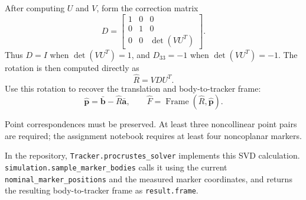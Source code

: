 \documentclass[11pt]{article}
\newcommand{\vct}[1]{\bm{#1}}
\newcommand{\Frame}{\operatorname{Frame}}
\begin{document}
After computing $U$ and $V$, form the correction matrix
\begin{equation}
D=
\begin{bmatrix}
1&0&0\\
0&1&0\\
0&0&\det(VU^T)
\end{bmatrix}.
\end{equation}
Thus $D=I$ when $\det(VU^T)=1$, and $D_{33}=-1$ when $\det(VU^T)=-1$. The rotation is then computed directly as
\begin{equation}
\boxed{\widehat R=VDU^T.}
\end{equation}
Use this rotation to recover the translation and body-to-tracker frame:
\begin{equation}
\boxed{
\widehat{\vct{p}}=\bar{\vct{b}}-\widehat R\bar{\vct{a}},
\qquad
\widehat F=\Frame(\widehat R,\widehat{\vct{p}}).}
\end{equation}

Point correspondences must be preserved. At least three noncollinear point pairs are required; the assignment notebook requires at least four noncoplanar markers.

In the repository, \texttt{Tracker.procrustes\_solver} implements this SVD calculation. \texttt{simulation.sample\_marker\_bodies} calls it using the current \texttt{nominal\_marker\_positions} and the measured marker coordinates, and returns the resulting body-to-tracker frame as \texttt{result.frame}.
\end{document}
